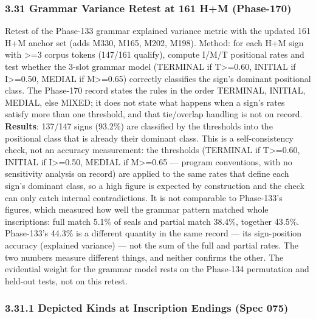 \documentclass[
]{article}
\begin{document}
\subsubsection{3.31 Grammar Variance Retest at 161 H+M
(Phase-170)}\label{grammar-variance-retest-phase-170}

Retest of the Phase-133 grammar explained variance metric with the
updated 161 H+M anchor set (adds M330, M165, M202, M198). Method:
for each H+M sign with \textgreater{}=3 corpus tokens (147/161 qualify), compute
I/M/T positional rates and test whether the 3-slot grammar model
(TERMINAL if T\textgreater{}=0.60, INITIAL if I\textgreater{}=0.50, MEDIAL if M\textgreater{}=0.65)
correctly classifies the sign's dominant positional class. The Phase-170 record states the rules in the order TERMINAL, INITIAL, MEDIAL, else MIXED; it does not state what happens when a sign's rates satisfy more than one threshold, and that tie/overlap handling is not on record.
\textbf{Results}: 137/147 signs (93.2\%) are classified by the thresholds into the positional class that is already their dominant class. This is a self-consistency check, not an accuracy measurement: the thresholds (TERMINAL if T\textgreater{}=0.60, INITIAL if I\textgreater{}=0.50, MEDIAL if M\textgreater{}=0.65 --- program conventions, with no sensitivity analysis on record) are applied to the same rates that define each sign's dominant class, so a high figure is expected by construction and the check can only catch internal contradictions. It is not comparable to Phase-133's figures, which measured how well the grammar pattern matched whole inscriptions: full match 5.1\% of seals and partial match 38.4\%, together 43.5\%. Phase-133's 44.3\% is a different quantity in the same record --- its sign-position accuracy (explained variance) --- not the sum of the full and partial rates. The two numbers measure different things, and neither confirms the other. The evidential weight for the grammar model rests on the Phase-134 permutation and held-out tests, not on this retest.

\subsubsection{3.31.1 Depicted Kinds at Inscription Endings
(Spec 075)}\label{depicted-kinds-at-inscription-endings-spec-075}
\end{document}
